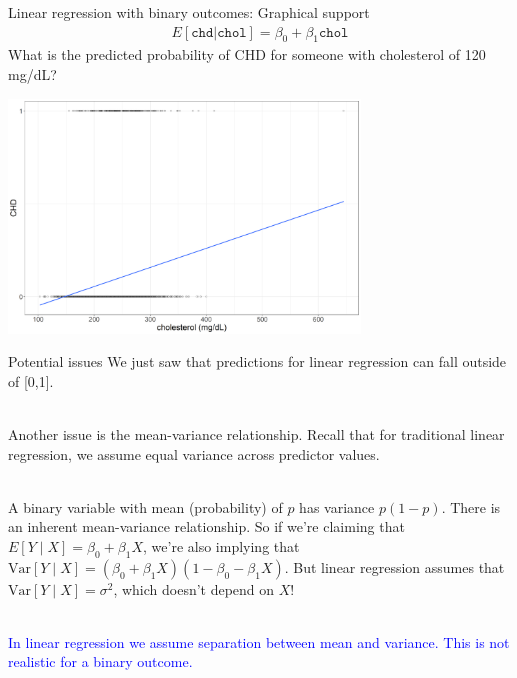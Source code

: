 \documentclass[10pt,t]{beamer}
\begin{document}
\begin{frame}{Linear regression with binary outcomes: Graphical support}
	\vspace{-1cm}
	\begin{align*} 
		E[\texttt{chd}|\texttt{chol}] = \beta_0 + \beta_1 \texttt{chol}  
	\end{align*}
	What is the predicted probability of CHD for someone with cholesterol of 120 mg/dL?
	
	\begin{center}
		\includegraphics[width=0.7\textwidth]{./figs/scatter_lm}
	\end{center}
\end{frame}

\begin{frame}{Potential issues}
	We just saw that predictions for linear regression can fall outside of [0,1]. 
	\\ ~\
	
	Another issue is the mean-variance relationship. Recall that for traditional linear regression, we assume equal variance across predictor values.
	\\ ~\ 
	
	A binary variable with mean (probability) of $p$ has variance $p(1-p)$. There is an inherent mean-variance relationship. So if we're claiming that $E[Y \mid X] = \beta_0 + \beta_1X$, we're also implying that $\text{Var}[Y \mid X] = (\beta_0 + \beta_1 X)(1 - \beta_0 - \beta_1 X)$. But linear regression assumes that $\text{Var}[Y \mid X] = \sigma^2$, which doesn't depend on $X$!
	\\ ~\ 
	
	 \textcolor{blue}{In linear regression we assume separation between mean and variance. This is not realistic for a binary outcome.} 
\end{frame}
\end{document}
